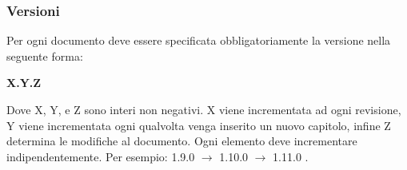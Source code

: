 \subsubsection{Versioni}
Per ogni documento deve essere specificata obbligatoriamente la versione nella seguente forma: 
\begin{center}
\textbf{X.Y.Z}
\end{center}
Dove X, Y, e Z sono interi non negativi. X viene incrementata ad ogni revisione, Y viene incrementata ogni qualvolta venga inserito un nuovo capitolo, infine Z determina le modifiche al documento. Ogni elemento deve incrementare indipendentemente. Per esempio: 1.9.0 $\rightarrow$ 1.10.0 $\rightarrow$ 1.11.0 .


